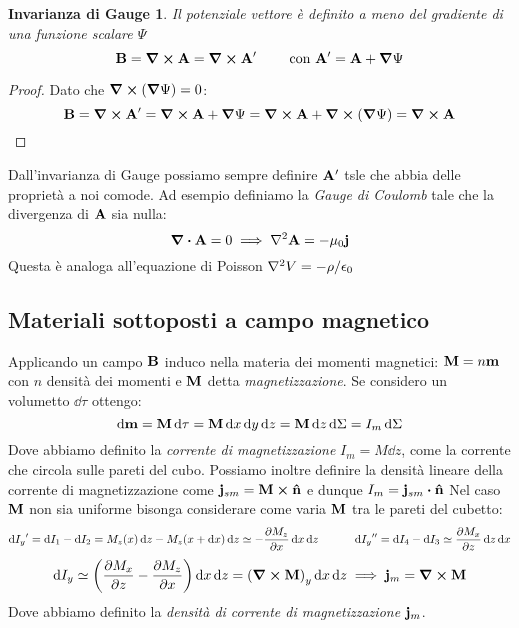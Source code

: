 \documentclass[12pt,a4paper]{article}
\begin{document}
\newtheorem*{IG}{Invarianza di Gauge}
\begin{IG}
    Il potenziale vettore è definito a meno del gradiente di una funzione scalare $\Psi$
    \begin{equation*}
        \vb{B}= \curl{\vb{A}}= \curl{\vb{A}'} \qquad \text{ con } \vb{A}' = \vb{A}+\grad{\Psi}
    \end{equation*}
\end{IG}
\begin{proof}
    Dato che $\curl(\grad{\Psi})= 0$:
    \begin{equation*}
        \vb{B}= \curl{\vb{A}'}= \curl{\vb{A}+\grad{\Psi}} =  \curl{\vb{A}} + \curl(\grad{\Psi})=  \curl{\vb{A}}
    \end{equation*}
\end{proof}

Dall'invarianza di Gauge possiamo sempre definire $\vb{A}'$ tsle che abbia delle proprietà a noi comode. Ad esempio definiamo
la \textit{Gauge di Coulomb} tale che la divergenza di $\vb{A}$ sia nulla:
\begin{equation*}
    \div{\vb{A}}=0 \implies\laplacian{\vb{A}}= -\mu_0\vb{j}
\end{equation*}
Questa è analoga all'equazione di Poisson $\laplacian{V}= -\rho/\epsilon_0$

\subsection{Materiali sottoposti a campo magnetico}
Applicando un campo $\vb{B}$ induco nella materia dei momenti magnetici: $\vb{M} = n\vb{m}$ con $n$ densità dei momenti e $\vb{M}$ detta \textit{magnetizzazione}.
Se considero un volumetto $\dd{\tau}$ ottengo:
\begin{equation*}
    \dd{\vb{m}}= \vb{M}\dd{\tau} = \vb{M}\dd{x}\dd{y}\dd{z}= \vb{M}\dd{z}\dd{\Sigma}= I_m\dd{\Sigma}
\end{equation*}
Dove abbiamo definito la \textit{corrente di magnetizzazione} $I_m= M\dd{z}$, come la corrente che circola sulle pareti del cubo. 
Possiamo inoltre definire la densità lineare della 
corrente di magnetizzazione come $\vb{j}_{sm}= \vb{M}\cp\vu{n}$ e dunque $I_m= \vb{j}_{sm}\vdot\vu{n}$ 
Nel caso $\vb{M}$ non sia uniforme bisonga considerare come varia $\vb{M}$ tra le pareti del cubetto:
\begin{equation*}
    \dd{I_y}'= \dd{I_1}-\dd{I_2}= M_z(x)\dd{z}-M_z(x+\dd{x})\dd{z}\simeq-\pdv{M_z}{x}\dd{x}\dd{z}\qquad \quad 
    \dd{I_y}'' = \dd{I_4}-\dd{I_3}\simeq \pdv{M_x}{z}\dd{z}\dd{x}
\end{equation*}
\begin{equation*}
    \dd{I_y}\simeq \left( \pdv{M_x}{z}-\pdv{M_z}{x} \right)\dd{x}\dd{z}= \left( \curl{\vb{M}} \right)_y \dd{x}\dd{z}
    \implies \vb{j}_m = \curl{\vb{M}}
\end{equation*}
Dove abbiamo definito la \textit{densità di corrente di magnetizzazione} $\vb{j}_m$.
\end{document}
